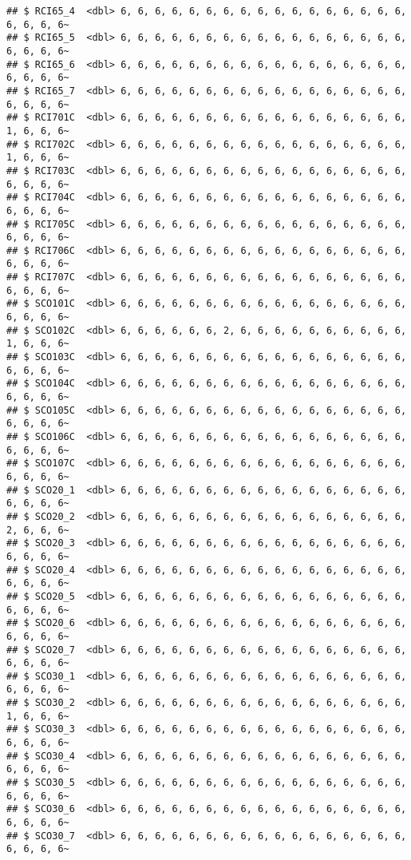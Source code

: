 \documentclass[
]{article}
\begin{document}
\begin{verbatim}
## $ RCI65_4  <dbl> 6, 6, 6, 6, 6, 6, 6, 6, 6, 6, 6, 6, 6, 6, 6, 6, 6, 6, 6, 6, 6~
## $ RCI65_5  <dbl> 6, 6, 6, 6, 6, 6, 6, 6, 6, 6, 6, 6, 6, 6, 6, 6, 6, 6, 6, 6, 6~
## $ RCI65_6  <dbl> 6, 6, 6, 6, 6, 6, 6, 6, 6, 6, 6, 6, 6, 6, 6, 6, 6, 6, 6, 6, 6~
## $ RCI65_7  <dbl> 6, 6, 6, 6, 6, 6, 6, 6, 6, 6, 6, 6, 6, 6, 6, 6, 6, 6, 6, 6, 6~
## $ RCI701C  <dbl> 6, 6, 6, 6, 6, 6, 6, 6, 6, 6, 6, 6, 6, 6, 6, 6, 6, 1, 6, 6, 6~
## $ RCI702C  <dbl> 6, 6, 6, 6, 6, 6, 6, 6, 6, 6, 6, 6, 6, 6, 6, 6, 6, 1, 6, 6, 6~
## $ RCI703C  <dbl> 6, 6, 6, 6, 6, 6, 6, 6, 6, 6, 6, 6, 6, 6, 6, 6, 6, 6, 6, 6, 6~
## $ RCI704C  <dbl> 6, 6, 6, 6, 6, 6, 6, 6, 6, 6, 6, 6, 6, 6, 6, 6, 6, 6, 6, 6, 6~
## $ RCI705C  <dbl> 6, 6, 6, 6, 6, 6, 6, 6, 6, 6, 6, 6, 6, 6, 6, 6, 6, 6, 6, 6, 6~
## $ RCI706C  <dbl> 6, 6, 6, 6, 6, 6, 6, 6, 6, 6, 6, 6, 6, 6, 6, 6, 6, 6, 6, 6, 6~
## $ RCI707C  <dbl> 6, 6, 6, 6, 6, 6, 6, 6, 6, 6, 6, 6, 6, 6, 6, 6, 6, 6, 6, 6, 6~
## $ SCO101C  <dbl> 6, 6, 6, 6, 6, 6, 6, 6, 6, 6, 6, 6, 6, 6, 6, 6, 6, 6, 6, 6, 6~
## $ SCO102C  <dbl> 6, 6, 6, 6, 6, 6, 2, 6, 6, 6, 6, 6, 6, 6, 6, 6, 6, 1, 6, 6, 6~
## $ SCO103C  <dbl> 6, 6, 6, 6, 6, 6, 6, 6, 6, 6, 6, 6, 6, 6, 6, 6, 6, 6, 6, 6, 6~
## $ SCO104C  <dbl> 6, 6, 6, 6, 6, 6, 6, 6, 6, 6, 6, 6, 6, 6, 6, 6, 6, 6, 6, 6, 6~
## $ SCO105C  <dbl> 6, 6, 6, 6, 6, 6, 6, 6, 6, 6, 6, 6, 6, 6, 6, 6, 6, 6, 6, 6, 6~
## $ SCO106C  <dbl> 6, 6, 6, 6, 6, 6, 6, 6, 6, 6, 6, 6, 6, 6, 6, 6, 6, 6, 6, 6, 6~
## $ SCO107C  <dbl> 6, 6, 6, 6, 6, 6, 6, 6, 6, 6, 6, 6, 6, 6, 6, 6, 6, 6, 6, 6, 6~
## $ SCO20_1  <dbl> 6, 6, 6, 6, 6, 6, 6, 6, 6, 6, 6, 6, 6, 6, 6, 6, 6, 6, 6, 6, 6~
## $ SCO20_2  <dbl> 6, 6, 6, 6, 6, 6, 6, 6, 6, 6, 6, 6, 6, 6, 6, 6, 6, 2, 6, 6, 6~
## $ SCO20_3  <dbl> 6, 6, 6, 6, 6, 6, 6, 6, 6, 6, 6, 6, 6, 6, 6, 6, 6, 6, 6, 6, 6~
## $ SCO20_4  <dbl> 6, 6, 6, 6, 6, 6, 6, 6, 6, 6, 6, 6, 6, 6, 6, 6, 6, 6, 6, 6, 6~
## $ SCO20_5  <dbl> 6, 6, 6, 6, 6, 6, 6, 6, 6, 6, 6, 6, 6, 6, 6, 6, 6, 6, 6, 6, 6~
## $ SCO20_6  <dbl> 6, 6, 6, 6, 6, 6, 6, 6, 6, 6, 6, 6, 6, 6, 6, 6, 6, 6, 6, 6, 6~
## $ SCO20_7  <dbl> 6, 6, 6, 6, 6, 6, 6, 6, 6, 6, 6, 6, 6, 6, 6, 6, 6, 6, 6, 6, 6~
## $ SCO30_1  <dbl> 6, 6, 6, 6, 6, 6, 6, 6, 6, 6, 6, 6, 6, 6, 6, 6, 6, 6, 6, 6, 6~
## $ SCO30_2  <dbl> 6, 6, 6, 6, 6, 6, 6, 6, 6, 6, 6, 6, 6, 6, 6, 6, 6, 1, 6, 6, 6~
## $ SCO30_3  <dbl> 6, 6, 6, 6, 6, 6, 6, 6, 6, 6, 6, 6, 6, 6, 6, 6, 6, 6, 6, 6, 6~
## $ SCO30_4  <dbl> 6, 6, 6, 6, 6, 6, 6, 6, 6, 6, 6, 6, 6, 6, 6, 6, 6, 6, 6, 6, 6~
## $ SCO30_5  <dbl> 6, 6, 6, 6, 6, 6, 6, 6, 6, 6, 6, 6, 6, 6, 6, 6, 6, 6, 6, 6, 6~
## $ SCO30_6  <dbl> 6, 6, 6, 6, 6, 6, 6, 6, 6, 6, 6, 6, 6, 6, 6, 6, 6, 6, 6, 6, 6~
## $ SCO30_7  <dbl> 6, 6, 6, 6, 6, 6, 6, 6, 6, 6, 6, 6, 6, 6, 6, 6, 6, 6, 6, 6, 6~

\end{verbatim}
\end{document}
